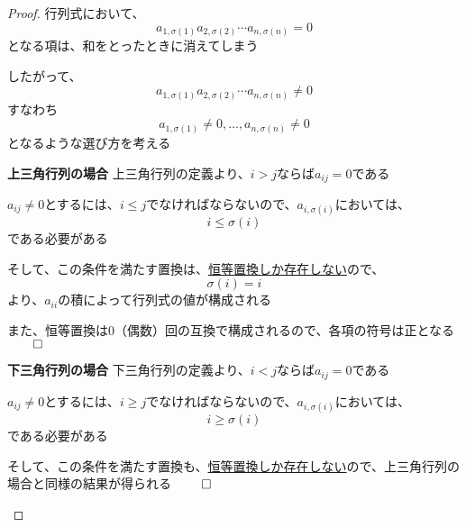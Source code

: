\documentclass[../../../topic_linear-algebra]{subfiles}
\begin{document}
\begin{proof}
  行列式において、
  \begin{equation*}
    a_{1,\sigma(1)} a_{2,\sigma(2)} \cdots a_{n,\sigma(n)} = 0
  \end{equation*}
  となる項は、和をとったときに消えてしまう

  したがって、
  \begin{equation*}
    a_{1,\sigma(1)} a_{2,\sigma(2)} \cdots a_{n,\sigma(n)} \neq 0
  \end{equation*}
  すなわち
  \begin{equation*}
    a_{1,\sigma(1)} \neq 0, \ldots, a_{n,\sigma(n)} \neq 0
  \end{equation*}
  となるような選び方を考える

  \begin{subpattern}{\bfseries 上三角行列の場合}
    上三角行列の定義より、$i > j$ならば$a_{ij} = 0$である

    $a_{ij} \neq 0$とするには、$i \leq j$でなければならないので、$a_{i,\sigma(i)}$においては、
    \begin{equation*}
      i \leq \sigma(i)
    \end{equation*}
    である必要がある

    そして、この条件を満たす置換は、\hyperref[thm:identity-permutation-characterized-by-monotonicity]{恒等置換しか存在しない}ので、
    \begin{equation*}
      \sigma(i) = i
    \end{equation*}
    より、$a_{ii}$の積によって行列式の値が構成される

    また、恒等置換は0（偶数）回の互換で構成されるので、各項の符号は正となる $\qed$
  \end{subpattern}

  \begin{subpattern}{\bfseries 下三角行列の場合}
    下三角行列の定義より、$i < j$ならば$a_{ij} = 0$である

    $a_{ij} \neq 0$とするには、$i \geq j$でなければならないので、$a_{i,\sigma(i)}$においては、
    \begin{equation*}
      i \geq \sigma(i)
    \end{equation*}
    である必要がある

    そして、この条件を満たす置換も、\hyperref[thm:identity-permutation-characterized-by-monotonicity]{恒等置換しか存在しない}ので、上三角行列の場合と同様の結果が得られる $\qed$
  \end{subpattern}
\end{proof}
\end{document}
